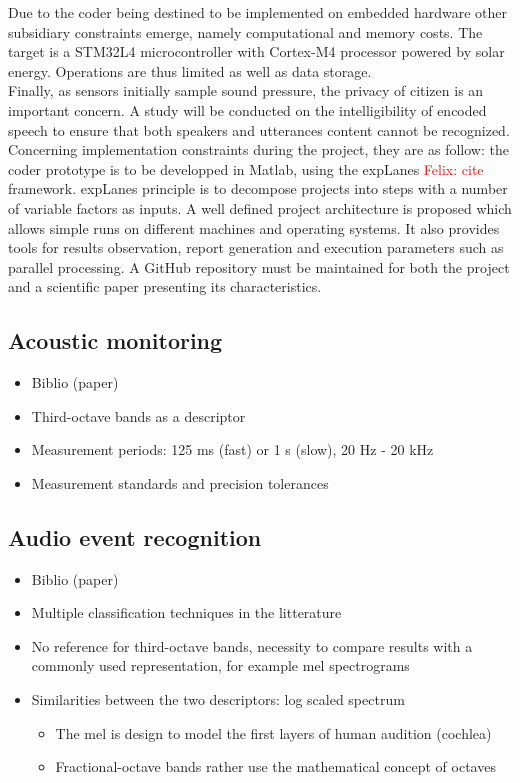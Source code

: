 \documentclass[12pt,times,onecolumn]{article}
\newcommand{\fg}[1]{\textcolor{red}{ Felix: #1}}
\begin{document}
Due to the coder being destined to be implemented on embedded hardware other subsidiary constraints emerge, namely computational and memory costs. The target is a STM32L4 microcontroller with Cortex-M4 processor powered by solar energy. Operations are thus limited as well as data storage.\\

Finally, as sensors initially sample sound pressure, the privacy of citizen is an important concern. A study will be conducted on the intelligibility of encoded speech to ensure that both speakers and utterances content cannot be recognized.\\

Concerning implementation constraints during the project, they are as follow: the coder prototype is to be developped in Matlab, using the expLanes \fg{cite} framework. expLanes principle is to decompose projects into steps with a number of variable factors as inputs. A well defined project architecture is proposed which allows simple runs on different machines and operating systems. It also provides tools for results observation, report generation and execution parameters such as parallel processing. A GitHub repository must be maintained for both the project and a scientific paper presenting its characteristics.

\subsection{Acoustic monitoring}

\begin{itemize}
\item Biblio (paper)
\item Third-octave bands as a descriptor
\item Measurement periods: 125 ms (fast) or 1 s (slow), 20 Hz - 20 kHz
\item Measurement standards and precision tolerances
\end{itemize}
\subsection{Audio event recognition}
\begin{itemize}
\item Biblio (paper)
\item Multiple classification techniques in the litterature
\item No reference for third-octave bands, necessity to compare results with a commonly used representation, for example mel spectrograms
\item Similarities between the two descriptors: log scaled spectrum
\begin{itemize}
\item The mel is design to model the first layers of human audition (cochlea)
\item Fractional-octave bands rather use the mathematical concept of octaves
\end{itemize}
\end{itemize}
\end{document}

